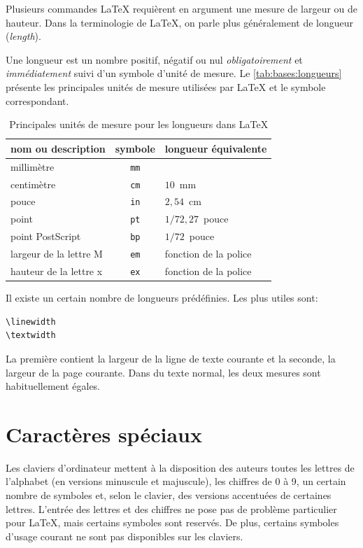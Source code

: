 Plusieurs commandes {\LaTeX} requièrent en argument une mesure de
largeur ou de hauteur. Dans la terminologie de {\LaTeX}, on parle plus
généralement de longueur (\emph{length}).

Une longueur est un nombre positif, négatif ou nul
\emph{obligatoirement} et \emph{immédiatement} suivi d'un symbole
d'unité de mesure. Le \autoref{tab:bases:longueurs} présente les
principales unités de mesure utilisées par {\LaTeX} et le symbole
correspondant.

\begin{table}
  \caption{Principales unités de mesure pour les longueurs dans
    {\LaTeX}}
  \label{tab:bases:longueurs}
  \centering
  \begin{tabular}{lcl}
    \toprule
    nom ou description & symbole & longueur équivalente \\
    \midrule
    millimètre & \texttt{mm} \\
    centimètre & \texttt{cm} & $10$~mm \\
    pouce      & \texttt{in} & $2,54$~cm \\
    point      & \texttt{pt} & $1/72,27$~pouce \\
    point PostScript     & \texttt{bp}   & $1/72$~pouce \\
    largeur de la lettre M & \texttt{em} & fonction de la police \\
    hauteur de la lettre x & \texttt{ex} & fonction de la police \\
    \bottomrule
  \end{tabular}
\end{table}

Il existe un certain nombre de longueurs prédéfinies. Les plus utiles
sont:
\begin{lstlisting}
\linewidth
\textwidth
\end{lstlisting}
La première contient la largeur de la ligne de texte courante et la
seconde, la largeur de la page courante. Dans du texte normal, les
deux mesures sont habituellement égales.


\section{Caractères spéciaux}
\label{sec:bases:caracteres}

Les claviers d'ordinateur mettent à la disposition des auteurs toutes
les lettres de l'alphabet (en versions minuscule et majuscule), les
chiffres de 0 à 9, un certain nombre de symboles et, selon le clavier,
des versions accentuées de certaines lettres. L'entrée des lettres et
des chiffres ne pose pas de problème particulier pour {\LaTeX}, mais
certains symboles sont reservés. De plus, certains symboles d'usage
courant ne sont pas disponibles sur les claviers.

